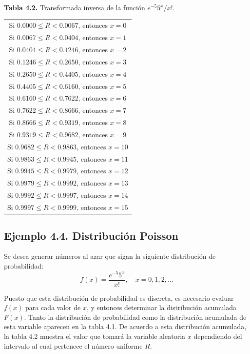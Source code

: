 \documentclass{article}
\begin{document}
\textbf{Tabla 4.2.} Transformada inversa de la función $e^{-5} 5^x / x!${}.

\begin{center}
\begin{tabular}{c}
\toprule
    Si $0.0000 \leq R < 0.0067$, entonces $x=0$ \\
    Si $0.0067 \leq R < 0.0404$, entonces $x=1$ \\
    Si $0.0404 \leq R < 0.1246$, entonces $x=2$ \\
    Si $0.1246 \leq R < 0.2650$, entonces $x=3$ \\
    Si $0.2650 \leq R < 0.4405$, entonces $x=4$ \\
    Si $0.4405 \leq R < 0.6160$, entonces $x=5$ \\
    Si $0.6160 \leq R < 0.7622$, entonces $x=6$ \\
    Si $0.7622 \leq R < 0.8666$, entonces $x=7$ \\
    Si $0.8666 \leq R < 0.9319$, entonces $x=8$ \\
    Si $0.9319 \leq R < 0.9682$, entonces $x=9$  \\
    Si $0.9682 \leq R < 0.9863$, entonces $x=10$    \\
    Si $0.9863 \leq R < 0.9945$, entonces $x=11$    \\
    Si $0.9945 \leq R < 0.9979$, entonces $x=12$    \\
    Si $0.9979 \leq R < 0.9992$, entonces $x=13$    \\
    Si $0.9992 \leq R < 0.9997$, entonces $x=14$    \\
    Si $0.9997 \leq R < 0.9999$, entonces $x=15$    \\
\bottomrule
\end{tabular}
\end{center}

\subsection*{Ejemplo 4.4. Distribución Poisson}

Se desea generar números al azar que sigan la siguiente distribución de probabilidad:
\begin{equation}
f(x) = \frac{e^{-5} 5^x}{x!}, \quad x = 0, 1, 2, \dots \tag{4.8}
\end{equation}

Puesto que esta distribución de probabilidad es discreta, es necesario evaluar $f(x)$ para cada valor de $x$, y entonces determinar la distribución acumulada $F(x)$. Tanto la distribución de probabilidad como la distribución acumulada de esta variable aparecen en la tabla 4.1. De acuerdo a esta distribución acumulada, la tabla 4.2 muestra el valor que tomará la variable aleatoria $x$ dependiendo del intervalo al cual pertenece el número uniforme $R$.
\end{document}
